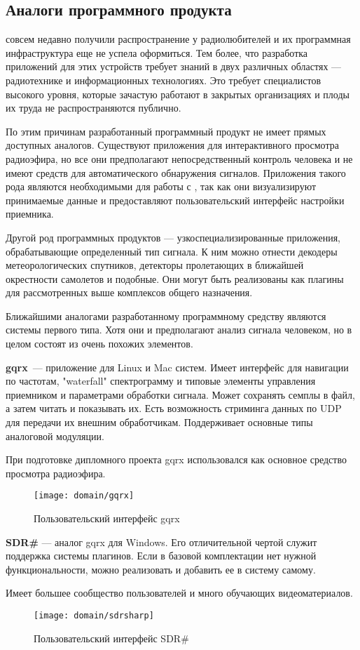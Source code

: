 \subsection{Аналоги программного продукта}

\SDR совсем недавно получили распространение у радиолюбителей и их программная инфраструктура еще не успела оформиться. \cite{sdr_reddit} Тем более, что разработка приложений для этих устройств требует знаний в двух различных областях --- радиотехнике и информационных технологиях. Это требует специалистов высокого уровня, которые зачастую работают в закрытых организациях и плоды их труда не распространяются публично.

По этим причинам разработанный программный продукт не имеет прямых доступных аналогов. Существуют приложения для интерактивного просмотра радиоэфира, но все они предполагают непосредственный контроль человека и не имеют средств для автоматического обнаружения сигналов. Приложения такого рода являются необходимыми для работы с \SDR, так как они визуализируют принимаемые данные и предоставляют пользовательский интерфейс настройки приемника.

Другой род программных продуктов --- узкоспециализированные приложения, обрабатывающие определенный тип сигнала. К ним можно отнести декодеры метеорологических спутников, детекторы пролетающих в ближайшей окрестности самолетов и подобные. Они могут быть реализованы как плагины для рассмотренных выше комплексов общего назначения.

Ближайшими аналогами разработанному программному средству являются системы первого типа. Хотя они и предполагают анализ сигнала человеком, но в целом состоят из очень похожих элементов.

\textbf{gqrx}\ --- приложение для Linux и Mac систем. Имеет интерфейс для навигации по частотам, "waterfall" спектрограмму и типовые элементы управления приемником и параметрами обработки сигнала. Может сохранять семплы в файл, а затем читать и показывать их. Есть возможность стриминга данных по UDP для передачи их внешним обработчикам. Поддерживает основные типы аналоговой модуляции.

При подготовке дипломного проекта gqrx использовался как основное средство просмотра радиоэфира.

\begin{figure}[h]
  \centering
  \texttt{[image: domain/gqrx]}
  \caption{Пользовательский интерфейс gqrx}
  \label{fig:domain:gqrx}
\end{figure}

\textbf{SDR\#} --- аналог gqrx для Windows. Его отличительной чертой служит поддержка системы плагинов. Если в базовой комплектации нет нужной функциональности, можно реализовать и добавить ее в систему самому.

Имеет большее сообщество пользователей и много обучающих видеоматериалов.

\begin{figure}[h]
  \centering
  \texttt{[image: domain/sdrsharp]}
  \caption{Пользовательский интерфейс SDR\#}
  \label{fig:domain:sdrsharp}
\end{figure}

\vspace*{25cm}  %
